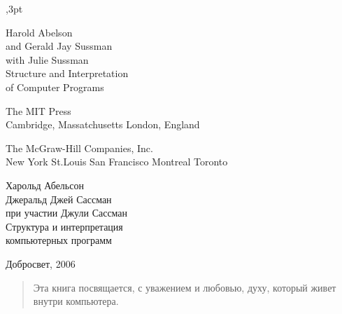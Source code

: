 \documentclass[twoside]{book}%
\begin{document}
\renewcommand{\@makechapterhead}[1]{
  \vspace*{10pt}%
  {\parindent=0pt
   \hrule
   \par\medskip
   \centering \huge\sc Глава{}
   \thechapter
   \par
   \vspace{10pt}
   \huge {\bf\sc{#1}}
   \par\medskip
   \hrule
   \nopagebreak
   \vspace{10pt}
}}

,3pt
\begin{titlepage}

\begin{center}
{\sf\huge
Harold Abelson\\[20pt]

{\large and} Gerald Jay Sussman\\[20pt]

{\large with} Julie Sussman \\[150pt]

Structure and Interpretation \\[6pt]
of Computer Programs}

\vfill

{\sf\normalsize 
The MIT Press\\
Cambridge, Massatchusetts \hfill London, England

The McGraw-Hill Companies, Inc.\\
New York \hfill St.Louis \hfill San Francisco \hfill Montreal \hfill Toronto 
}

\clearpage
\thispagestyle{empty}
{\sf\huge
Харольд Абельсон \\[20pt]

Джеральд Джей Сассман\\[20pt]

{\large при участии} Джули Сассман\\[150pt]

Структура и интерпретация \\[6pt]

компьютерных программ
}

{\sf
Добросвет, 2006
}

\end{center}
\clearpage
\mbox{}
\clearpage
\thispagestyle{empty}
\begin{quote}
Эта книга посвящается, с уважением и любовью, духу,
который живет внутри компьютера.\\[10pt] %


\end{quote}
\end{titlepage}
\end{document}
